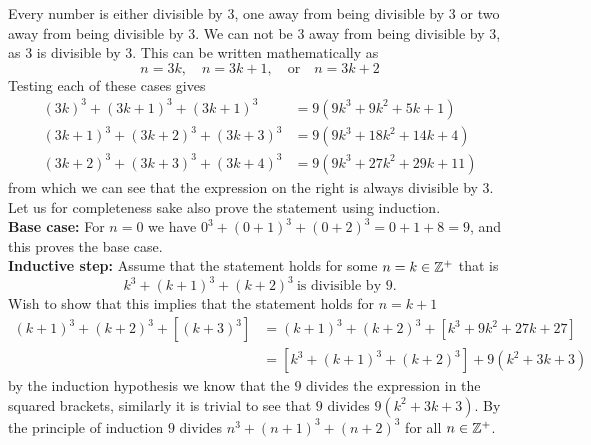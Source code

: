 \documentclass[a4paper, english, 12pt]{article} %
\begin{document}
\begin{answer}
  Every number is either divisible by 3, one away from being divisible by 3 or
  two away from being divisible by 3. We can not be 3 away from being divisible
  by 3, as $3$ is divisible by $3$. This can be written mathematically as
  \begin{equation*}
    n = 3k, \quad n = 3k + 1, \quad \text{or} \quad n = 3k + 2
  \end{equation*}
  Testing each of these cases gives
  \begin{align*}
    (3k)^3 + (3k+1)^3 + (3k + 1)^3 & = 9(9k^3 + 9k^2 + 5k + 1) \\ 
    (3k+1)^3 + (3k+2)^3 + (3k + 3)^3 & = 9(9k^3 + 18k^2 + 14k + 4) \\ 
    (3k+2)^3 + (3k+3)^3 + (3k + 4)^3 & = 9(9k^3 + 27k^2 + 29k + 11)  
  \end{align*}
  from which we can see that the expression on the right is always divisible by
  $3$. Let us for completeness sake also prove the statement using induction. \\
  \textbf{Base case:} For $n=0$ we have $0^3 + (0+1)^3 + (0+2)^3 = 0 + 1 + 8 = 9$,
  and this proves the base case. \\
  \textbf{Inductive step:} Assume that the statement holds for some $n = k \in \mathbb{Z}^+$
  that is
  \begin{equation*}
    k^3 + (k+1)^3 + (k+2)^3 \ \text{is divisible by $9$.}
  \end{equation*}
  Wish to show that this implies that the statement holds for $n = k + 1$
  \begin{align*}
        (k+1)^3 + (k+2)^3 + [(k+3)^3]
    & = (k+1)^3 + (k+2)^3 + [k^3 + 9k^2 + 27k + 27] \\
    & = [k^3 + (k+1)^3 + (k+2)^3] + 9(k^2 + 3k + 3)
  \end{align*}
  by the induction hypothesis we know that the $9$ divides the expression in the
  squared brackets, similarly it is trivial to see that $9$ divides $9(k^2 + 3k +
  3)$. By the principle of induction $9$ divides $n^3 + (n+1)^3 + (n+2)^3$ for
  all $n \in \mathbb{Z}^+$. 
\end{answer}
\end{document}
